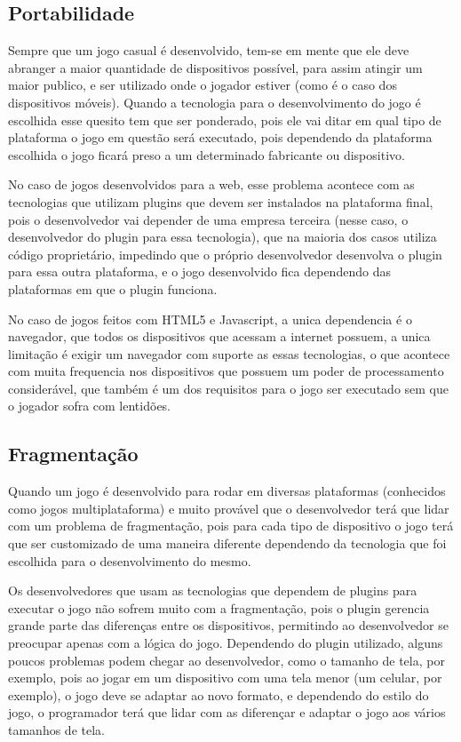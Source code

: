 \subsection{Portabilidade}

Sempre que um jogo casual é desenvolvido, tem-se em mente que ele deve
abranger a maior quantidade de dispositivos possível, para assim
atingir um maior publico, e ser utilizado onde o jogador estiver (como
é o caso dos dispositivos móveis). Quando a tecnologia para o
desenvolvimento do jogo é escolhida esse quesito tem que ser
ponderado, pois ele vai ditar em qual tipo de plataforma o jogo em
questão será executado, pois dependendo da plataforma escolhida o jogo ficará preso
a um determinado fabricante ou dispositivo.

No caso de jogos desenvolvidos para a web, esse problema acontece com as
tecnologias que utilizam plugins que devem ser instalados na
plataforma final, pois o desenvolvedor vai depender de uma empresa
terceira (nesse caso, o desenvolvedor do plugin para essa tecnologia),
que na maioria dos casos utiliza código proprietário, impedindo que o
próprio desenvolvedor desenvolva o plugin para essa outra plataforma,
e o jogo desenvolvido fica dependendo das plataformas em que o plugin
funciona.

No caso de jogos feitos com HTML5 e Javascript, a unica dependencia é
o navegador, que todos os dispositivos que acessam a internet possuem,
a unica limitação é exigir um navegador com suporte as essas
tecnologias, o que acontece com muita frequencia nos dispositivos que
possuem um poder de processamento considerável, que também é um dos
requisitos para o jogo ser executado sem que o jogador sofra com
lentidões.

\subsection{Fragmentação}

Quando um jogo é desenvolvido para rodar em diversas plataformas
(conhecidos como jogos multiplataforma) e muito provável que o
desenvolvedor terá que lidar com um problema de fragmentação, pois
para cada tipo de dispositivo o jogo terá que ser customizado de uma
maneira diferente dependendo da tecnologia que foi escolhida para o
desenvolvimento do mesmo.

Os desenvolvedores que usam as tecnologias que dependem de plugins para executar o
jogo não sofrem muito com a fragmentação, pois o plugin gerencia
grande parte das diferenças entre os dispositivos, permitindo ao
desenvolvedor se preocupar apenas com a lógica do jogo. Dependendo do
plugin utilizado, alguns poucos problemas podem chegar ao
desenvolvedor, como o tamanho de tela, por exemplo, pois ao jogar em
um dispositivo com uma tela menor (um celular, por exemplo), o jogo
deve se adaptar ao novo formato, e dependendo do estilo do jogo, o
programador terá que lidar com as diferençar e adaptar o jogo aos
vários tamanhos de tela.

